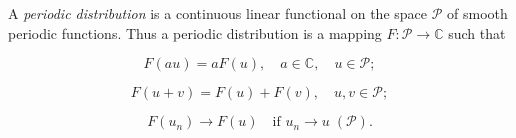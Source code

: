 A \textit{periodic distribution} is a continuous linear functional on the space $\mathcal{P}$ of smooth periodic functions. Thus a periodic distribution is a mapping $F: \mathcal{P} \to \mathbb{C}$ such that

$$F(au) = aF(u), \quad a \in \mathbb{C}, \quad u \in \mathcal{P};$$

$$F(u + v) = F(u) + F(v), \quad u, v \in \mathcal{P};$$

$$F(u_n) \to F(u) \quad \text{if } u_n \to u \; (\mathcal{P}).$$
